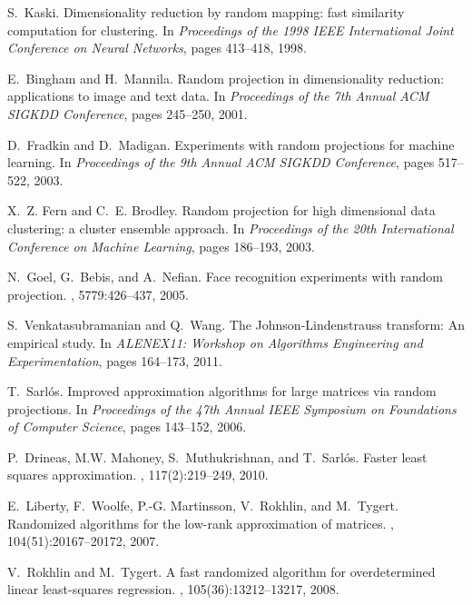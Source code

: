 \documentclass[twoside]{article}
\begin{document}
\begin{small}
\begin{thebibliography}{100}
S.~Kaski.
\newblock Dimensionality reduction by random mapping: fast similarity
  computation for clustering.
\newblock In {\em Proceedings of the 1998 IEEE International Joint Conference
  on Neural Networks}, pages 413--418, 1998.

E.~Bingham and H.~Mannila.
\newblock Random projection in dimensionality reduction: applications to image
  and text data.
\newblock In {\em Proceedings of the 7th Annual ACM SIGKDD Conference}, pages
  245--250, 2001.

D.~Fradkin and D.~Madigan.
\newblock Experiments with random projections for machine learning.
\newblock In {\em Proceedings of the 9th Annual ACM SIGKDD Conference}, pages
  517--522, 2003.

X.~Z. Fern and C.~E. Brodley.
\newblock Random projection for high dimensional data clustering: a cluster
  ensemble approach.
\newblock In {\em Proceedings of the 20th International Conference on Machine
  Learning}, pages 186--193, 2003.

N.~Goel, G.~Bebis, and A.~Nefian.
\newblock Face recognition experiments with random projection.
, 5779:426--437, 2005.

S.~Venkatasubramanian and Q.~Wang.
\newblock The {J}ohnson-{L}indenstrauss transform: An empirical study.
\newblock In {\em ALENEX11: Workshop on Algorithms Engineering and
  Experimentation}, pages 164--173, 2011.

T.~Sarl\'{o}s.
\newblock Improved approximation algorithms for large matrices via random
  projections.
\newblock In {\em Proceedings of the 47th Annual IEEE Symposium on Foundations
  of Computer Science}, pages 143--152, 2006.

P.~Drineas, M.W. Mahoney, S.~Muthukrishnan, and T.~Sarl\'{o}s.
\newblock Faster least squares approximation.
, 117(2):219--249, 2010.

E.~Liberty, F.~Woolfe, P.-G. Martinsson, V.~Rokhlin, and M.~Tygert.
\newblock Randomized algorithms for the low-rank approximation of matrices.
, 104(51):20167--20172, 2007.

V.~Rokhlin and M.~Tygert.
\newblock A fast randomized algorithm for overdetermined linear least-squares
  regression.
, 105(36):13212--13217, 2008.


\end{thebibliography}
\end{small}
\end{document}
